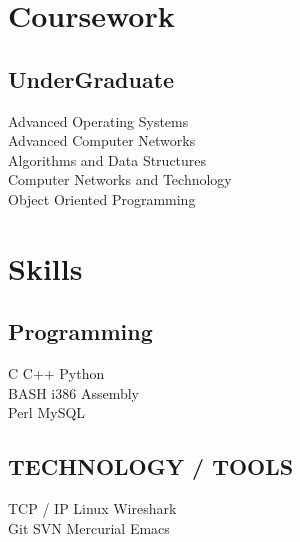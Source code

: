 \documentclass[letterpaper]{deedy-resume} %
\begin{document}
\begin{minipage}[t]{0.33\textwidth}
\section{Coursework}
\subsection{UnderGraduate}
Advanced Operating Systems \\
Advanced Computer Networks \\
Algorithms and Data Structures \\
Computer Networks and Technology \\
Object Oriented Programming \\
\sectionspace %
\section{Skills}
\subsection{Programming}
C \textbullet{} C++ \textbullet{} Python \\
BASH \textbullet{} i386 Assembly \\
Perl \textbullet{} MySQL
\sectionspace %
\subsection{TECHNOLOGY / TOOLS}
TCP / IP \textbullet{} Linux \textbullet{} Wireshark \\
Git \textbullet{} SVN \textbullet{} Mercurial \textbullet{}  Emacs
\end{minipage} %
\hfill
%
%
\end{document}
